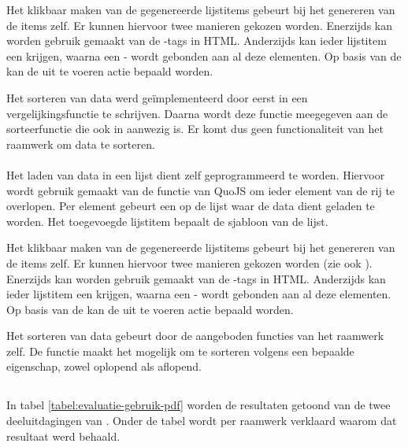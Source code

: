 Het klikbaar maken van de gegenereerde lijstitems gebeurt bij het genereren van de items zelf.
Er kunnen hiervoor twee manieren gekozen worden.
Enerzijds kan worden gebruik gemaakt van de -tags in HTML.
Anderzijds kan ieder lijstitem een  krijgen, waarna een -  wordt gebonden aan al deze elementen.
Op basis van de  kan de uit te voeren actie bepaald worden.

Het sorteren van data werd geïmplementeerd door eerst in \js{} een vergelijkingsfunctie te schrijven.
Daarna wordt deze functie meegegeven aan de sorteerfunctie die ook in \js{} aanwezig is.
Er komt dus geen functionaliteit van het raamwerk om data te sorteren.

\paragraph{\lungo}
Het laden van data in een lijst dient zelf geprogrammeerd te worden.
Hiervoor wordt gebruik gemaakt van de functie  van QuoJS om ieder element van de rij te overlopen.
Per element gebeurt een  op de lijst waar de data dient geladen te worden.
Het toegevoegde lijstitem bepaalt de sjabloon van de lijst.

Het klikbaar maken van de gegenereerde lijstitems gebeurt bij het genereren van de items zelf.
Er kunnen hiervoor twee manieren gekozen worden (zie ook \jqm{}).
Enerzijds kan worden gebruik gemaakt van de -tags in HTML.
Anderzijds kan ieder lijstitem een  krijgen, waarna een -  wordt gebonden aan al deze elementen.
Op basis van de  kan de uit te voeren actie bepaald worden.

Het sorteren van data gebeurt door de aangeboden functies van het raamwerk zelf.
De functie  maakt het mogelijk om te sorteren volgens een bepaalde eigenschap, zowel oplopend als aflopend.



\subsection{}
\label{sec:evaluatie-gebruik-pdf}

In tabel \ref{tabel:evaluatie-gebruik-pdf} worden de resultaten getoond van de twee deeluitdagingen van .
Onder de tabel wordt per raamwerk verklaard waarom dat resultaat werd behaald.

